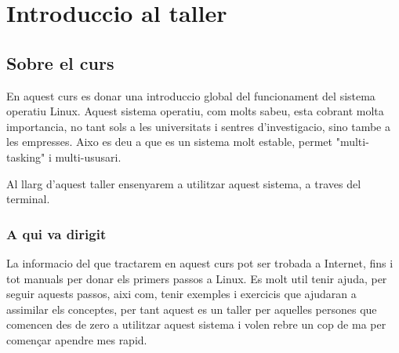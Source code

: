 \section{Introduccio al taller}

\subsection{Sobre el curs}

\par
En aquest curs es donar una introduccio global del funcionament del sistema operatiu Linux.
Aquest sistema operatiu, com molts sabeu, esta cobrant molta importancia, no tant sols a les universitats i sentres d'investigacio, sino tambe a les empresses.
Aixo es deu a que es un sistema molt estable, permet "multi-tasking" i multi-ususari.
\par
Al llarg d'aquest taller ensenyarem a utilitzar aquest sistema, a traves del terminal.

\subsubsection{A qui va dirigit}

\par
La informacio del que tractarem en aquest curs pot ser trobada a Internet, fins i tot manuals per donar els primers passos a Linux.
Es molt util tenir ajuda, per seguir aquests passos, aixi com, tenir exemples i exercicis que ajudaran a assimilar els conceptes, per tant aquest es un taller per aquelles persones que comencen des de zero a utilitzar aquest sistema i volen rebre un cop de ma per començar apendre mes rapid.